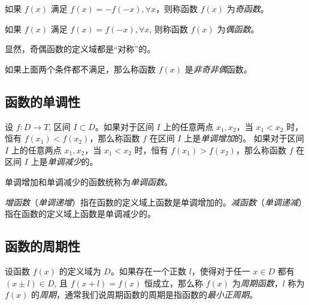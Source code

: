 \documentclass[lang=cn,10pt]{template}
\begin{document}
如果 $f(x)$ 满足 $f(x) = -f(-x), \forall x$，则称函数 $f(x)$ 为\emph{奇函数}。

如果 $f(x)$ 满足 $f(x) = f(-x), \forall x$, 则称函数 $f(x)$ 为\emph{偶函数}。

显然，奇偶函数的定义域都是“对称”的。

如果上面两个条件都不满足，那么称函数 $f(x)$ 是\emph{非奇非偶}函数。

\subsection{函数的单调性}

设 $f: D \rightarrow T$, 区间 $I \subset D$。如果对于区间 $I$ 上的任意两点 $x_1, x_2$，当 $x_1 < x_2$ 时，恒有 $f(x_1) < f(x_2)$，那么称函数 $f$ 在区间 $I$ 上是\emph{单调增加}的。
如果对于区间 $I$ 上的任意两点 $x_1, x_2$，当 $x_1 < x_2$ 时，恒有 $f(x_1) > f(x_2)$，那么称函数 $f$ 在区间 $I$ 上是\emph{单调减少}的。

单调增加和单调减少的函数统称为\emph{单调函数}。

\emph{增函数}（\emph{单调递增}）指在函数的定义域上函数是单调增加的。\emph{减函数}（\emph{单调递减}）指在函数的定义域上函数是单调减少的。

\subsection{函数的周期性}

设函数 $f(x)$ 的定义域为 $D$。如果存在一个正数 $l$，使得对于任一 $x \in D$ 都有 $(x \pm l) \in D$, 且 $f(x+l)=f(x)$ 恒成立，那么称 $f(x)$ 为\emph{周期函数}，$l$ 称为 $f(x)$ 的\emph{周期}，通常我们说周期函数的周期是指函数的\emph{最小正周期}。

\newpage
\end{document}
